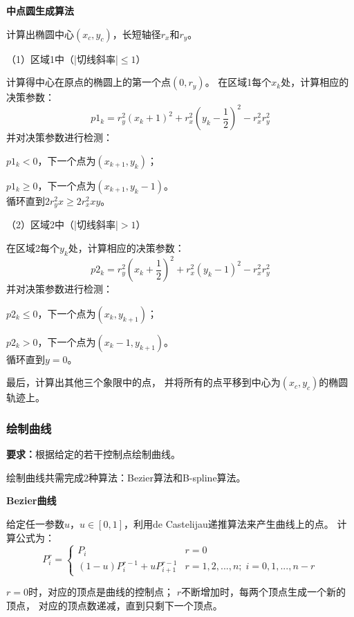\documentclass[a4paper,UTF8]{article}
\begin{document}
\textbf{中点圆生成算法}

计算出椭圆中心$(x_c,y_c)$，长短轴径$r_x$和$r_y$。

（1）区域1中（|切线斜率|$\leqslant 1$）

计算得中心在原点的椭圆上的第一个点$(0,r_y)$。
在区域1每个$x_k$处，计算相应的决策参数：
\begin{equation*}
    p1_{k}=r_y^2(x_k+1)^2+r_x^2(y_k-\frac{1}{2})^2-r_x^2r_y^2
\end{equation*}
并对决策参数进行检测：

$p1_k<0$，下一个点为$(x_{k+1},y_k)$；

$p1_k\geqslant 0$，下一个点为$(x_{k+1},y_k-1)$。
\\循环直到$2r_y^2x\geqslant 2r_x^2xy$。

（2）区域2中（|切线斜率|$>1$）

在区域2每个$y_k$处，计算相应的决策参数：
\begin{equation*}
    p2_{k}=r_y^2(x_k+\frac{1}{2})^2+r_x^2(y_k-1)^2-r_x^2r_y^2
\end{equation*}
并对决策参数进行检测：

$p2_k\leqslant 0$，下一个点为$(x_k,y_{k+1})$；

$p2_k>0$，下一个点为$(x_k-1,y_{k+1})$。
\\循环直到$y=0$。

最后，计算出其他三个象限中的点，
并将所有的点平移到中心为$(x_c,y_c)$的椭圆轨迹上。


\subsubsection{绘制曲线}
\textbf{要求：}根据给定的若干控制点绘制曲线。

绘制曲线共需完成2种算法：Bezier算法和B-spline算法。

\textbf{Bezier曲线}

给定任一参数$u$，$u\in [0,1]$，利用de Castelijau递推算法来产生曲线上的点。
计算公式为：
\begin{equation*}
    P_i^r=
    \begin{cases}
        P_i & r=0\\
        (1-u)P_i^{r-1}+uP_{i+1}^{r-1} & r=1,2,...,n;\; i=0,1,...,n-r
    \end{cases}
\end{equation*}

$r=0$时，对应的顶点是曲线的控制点；
$r$不断增加时，每两个顶点生成一个新的顶点，
对应的顶点数递减，直到只剩下一个顶点。
\end{document}
